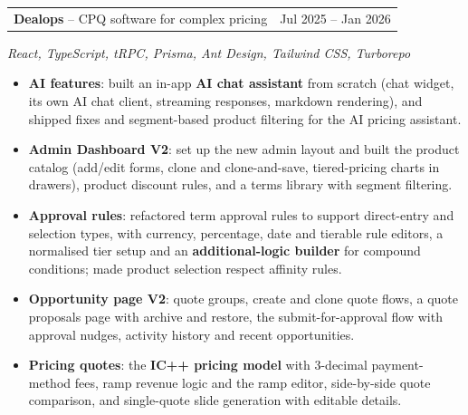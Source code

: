 \documentclass[10pt]{article}
\makeatletter
\newcommand{\project}[3]{%
  \vspace{3pt}%
  \begin{tabularx}{\linewidth}{@{}X r@{}}
    \textbf{#1} {\color{soft}-- #2} & {\small\color{soft}#3} \\
  \end{tabularx}\par}
\newcommand{\stack}[1]{{\small\color{soft}\textit{#1}}\par}
\makeatother
\begin{document}
\project{Dealops}{CPQ software for complex pricing}{Jul 2025 -- Jan 2026}
\stack{React, TypeScript, tRPC, Prisma, Ant Design, Tailwind CSS, Turborepo}
\begin{itemize}
  \item \textbf{AI features}: built an in-app \textbf{AI chat assistant} from scratch (chat widget, its own AI chat client,
        streaming responses, markdown rendering), and shipped fixes and segment-based product filtering for the
        AI pricing assistant.
  \item \textbf{Admin Dashboard V2}: set up the new admin layout and built the product catalog (add/edit forms, clone and
        clone-and-save, tiered-pricing charts in drawers), product discount rules, and a terms library with segment filtering.
  \item \textbf{Approval rules}: refactored term approval rules to support direct-entry and selection types, with currency,
        percentage, date and tierable rule editors, a normalised tier setup and an \textbf{additional-logic builder} for
        compound conditions; made product selection respect affinity rules.
  \item \textbf{Opportunity page V2}: quote groups, create and clone quote flows, a quote proposals page with archive and
        restore, the submit-for-approval flow with approval nudges, activity history and recent opportunities.
  \item \textbf{Pricing quotes}: the \textbf{IC++ pricing model} with 3-decimal payment-method fees, ramp revenue logic and the
        ramp editor, side-by-side quote comparison, and single-quote slide generation with editable details.
\end{itemize}
\end{document}
